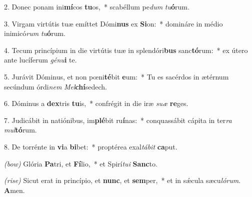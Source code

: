 2. Donec ponam ini\textbf{mí}cos \textbf{tu}os,~*
	scabéllum pe\textit{dum} \textit{tu}\textbf{ó}rum.

3. Virgam virtútis tuæ emíttet Dómi\textbf{nus} ex \textbf{Si}on:~*
	domináre in médio inimicó\textit{rum} \textit{tu}\textbf{ó}rum.

4. Tecum princípium in die virtútis tuæ in splendóri\textbf{bus} sanc\textbf{tó}rum:~*
	ex útero ante lucíferum \textit{gé}\textit{nu}\textbf{i} te.

5. Jurávit Dóminus, et non p{\oe}ni\textbf{té}\-bit \textbf{e}um:~*
	Tu es sacérdos in ætérnum secúndum órdi\textit{nem} \textit{Mel}\textbf{chí}se\-dech.

6. Dóminus a \textbf{dex}tris \textbf{tu}is,~*
	confrégit in die iræ \textit{su}\textit{æ} \textbf{re}ges.

7. Judicábit in natiónibus, im\textbf{plé}bit ru\textbf{í}nas:~*
	conquassábit cápita in ter\textit{ra} \textit{mul}\textbf{tó}rum.

8. De torrénte in \textbf{vi}a \textbf{bi}bet:~*
	proptérea exal\textit{tá}\textit{bit} \textbf{ca}put.

\textit{(bow)} Glória \textbf{Pa}tri, et \textbf{Fí}lio,~*
	et Spirí\textit{tu}\textit{i} \textbf{Sanc}to.

\textit{(rise)} Sicut erat in princípio, et \textbf{nunc}, et \textbf{sem}per,~*
	et in s\'{\ae}cula sæcu\textit{ló}\textit{rum}. \textbf{A}men.
